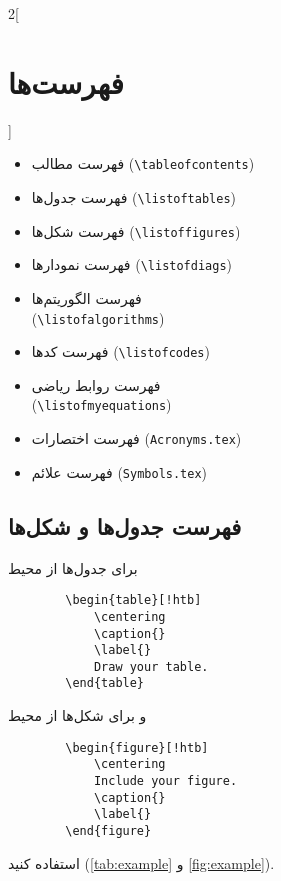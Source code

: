\begin{multicols}{2}[\section{فهرست‌ها}]
	\begin{itemize}
		\item
		فهرست مطالب
		(\verb|\tableofcontents|)
		\item
		فهرست جدول‌ها
		(\verb|\listoftables|)
		\item
		فهرست شکل‌ها
		(\verb|\listoffigures|)
		\item
		فهرست نمودارها
		(\verb|\listofdiags|)
		\item
		فهرست الگوریتم‌ها \\
		(\verb|\listofalgorithms|)
		\item
		فهرست کدها
		(\verb|\listofcodes|)
		\item
		فهرست روابط ریاضی \\
		(\verb|\listofmyequations|)
		\item
		فهرست اختصارات
		(\verb|Acronyms.tex|)
		\item
		فهرست علائم
		(\verb|Symbols.tex|)
	\end{itemize}
\end{multicols}

\subsection{فهرست جدول‌ها و شکل‌ها}
برای جدول‌ها از محیط
\begin{latin}
	\begin{verbatim}
		\begin{table}[!htb]
		    \centering
		    \caption{}
		    \label{}
		    Draw your table.
		\end{table}
	\end{verbatim}
\end{latin}\noindent
و برای شکل‌ها از محیط
\begin{latin}
	\begin{verbatim}
		\begin{figure}[!htb]
		    \centering
		    Include your figure.
		    \caption{}
		    \label{}
		\end{figure}
	\end{verbatim}
\end{latin}\noindent
استفاده کنید
(\autoref{tab:example}
و
\autoref{fig:example}).

